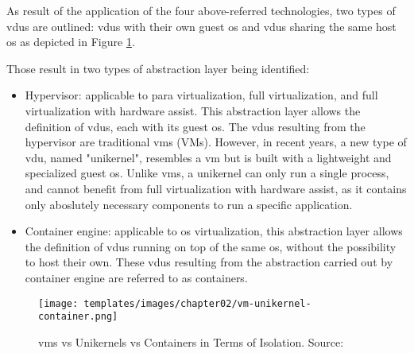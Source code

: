 \begin{enumerate}

        As result of the application of the four above-referred technologies, two types of \acrshort{vdu}s are outlined: \acrshort{vdu}s with their own guest \acrshort{os} and \acrshort{vdu}s sharing the same host \acrshort{os} as depicted in Figure \ref{fig:vm-unikernel-container}. 
        
        Those result in two types of abstraction layer being identified:
        \begin{itemize}
            \item Hypervisor: applicable to para virtualization, full virtualization, and full virtualization with hardware assist. This abstraction layer allows the definition of \acrshort{vdu}s, each with its guest \acrshort{os}. The \acrshort{vdu}s resulting from the hypervisor are traditional \acrlong{vm}s (VMs). However, in recent years, a new type of \acrshort{vdu}, named "unikernel", resembles a \acrshort{vm} but is built with a lightweight and specialized guest \acrshort{os}. Unlike \acrshort{vm}s, a unikernel can only run a single process, and cannot benefit from full virtualization with hardware assist, as it contains only aboslutely necessary components to run a specific application.
            \item Container engine: applicable to \acrshort{os} virtualization, this abstraction layer allows the definition of \acrshort{vdu}s running on top of the same \acrshort{os}, without the possibility to host their own. These \acrshort{vdu}s resulting from the abstraction carried out by container engine are referred to as containers.
        \end{itemize}

        \begin{figure}[!ht]
            \centering
            \texttt{[image: templates/images/chapter02/vm-unikernel-container.png]}
            \caption{\acrshort{vm}s vs Unikernels vs Containers in Terms of Isolation. Source: \cite{adrian_gallego_2019_2668763}}
            \label{fig:vm-unikernel-container}
        \end{figure}
        

\end{enumerate}
